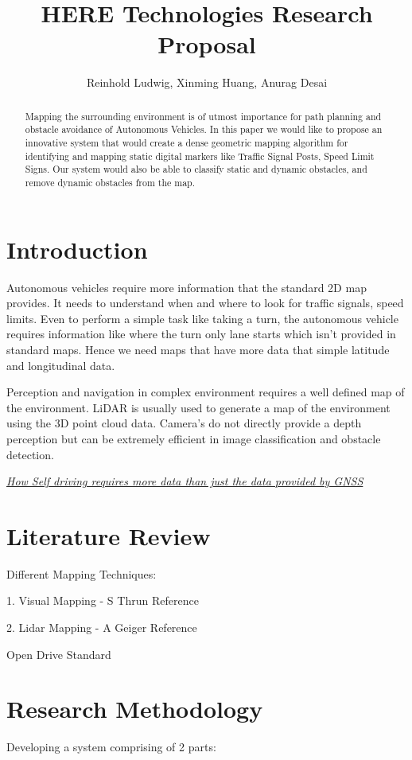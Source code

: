 \documentclass{article}
\begin{document}
	\title{HERE Technologies Research Proposal}
	\author{Reinhold Ludwig, Xinming Huang, Anurag Desai}
	\maketitle
	
	\begin{abstract}
		Mapping the surrounding environment is of utmost importance for path planning and obstacle avoidance of Autonomous Vehicles. In this paper we would like to propose an innovative system that would create a dense geometric mapping algorithm for identifying and mapping static digital markers like Traffic Signal Posts, Speed Limit Signs. Our system would also be able to classify static and dynamic obstacles, and remove dynamic obstacles from the map.
	\end{abstract}
	
	\section{Introduction}
	Autonomous vehicles require more information that the standard 2D map provides. It needs to understand when and where to look for traffic signals, speed limits. Even to perform a simple task like taking a turn, the autonomous vehicle requires information like where the turn only lane starts which isn't provided in standard maps. Hence we need maps that have more data that simple latitude and longitudinal data.
	
	Perception and navigation in complex environment requires a well defined map of the environment. LiDAR is usually used to generate a map of the environment using the 3D point cloud data. Camera's do not directly provide a depth perception but can be extremely efficient in image classification and obstacle detection.
	
	\underline{\textit{	How Self driving requires more data than just the data provided by GNSS}}
	
	\section{Literature Review}

	Different Mapping Techniques:
	
	1. Visual Mapping - S Thrun Reference
	
	2. Lidar Mapping - A Geiger Reference
		
	Open Drive Standard
	
	\section{Research Methodology}
	Developing a system comprising of 2 parts:
	
\end{document}
